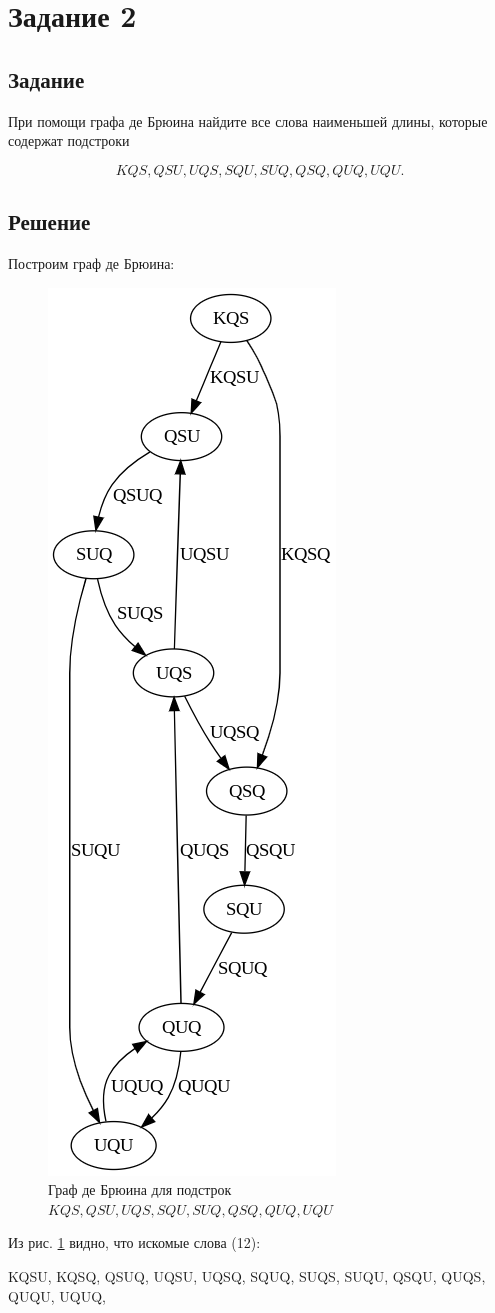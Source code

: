 \section*{Задание 2}

\subsection*{Задание}

При помощи графа де Брюина найдите все слова наименьшей длины,
которые содержат подстроки

$$ KQS, QSU, UQS, SQU, SUQ, QSQ, QUQ, UQU. $$

\subsection*{Решение}

Построим граф де Брюина:

\begin{figure}[H]
    \centering
    \includegraphics[width=0.28\linewidth]{photo/2s0}
    \caption{Граф де Брюина для подстрок $ KQS, QSU, UQS, SQU, SUQ, QSQ, QUQ, UQU $}
    \label{fig:2}
\end{figure}

Из рис. \ref{fig:2} видно, что искомые слова (12):

KQSU,
KQSQ,
QSUQ,
UQSU,
UQSQ,
SQUQ,
SUQS,
SUQU,
QSQU,
QUQS,
QUQU,
UQUQ,
